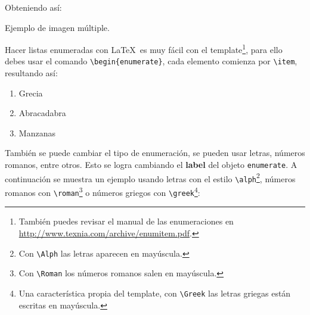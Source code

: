 	Obteniendo así:

	\begin{images}{Ejemplo de imagen múltiple.}
		\imagesnewline
	\end{images}


\newpage



		Hacer listas enumeradas con \LaTeX\ es muy fácil con el template\footnote{También puedes revisar el manual de las enumeraciones en \url{http://www.texnia.com/archive/enumitem.pdf}.}, para ello debes usar el comando \texttt{\textbackslash begin\{enumerate\}}, cada elemento comienza por \texttt{\textbackslash item}, resultando así:

		\begin{enumerate}
			\item Grecia
			\item Abracadabra
			\item Manzanas
		\end{enumerate}

		También se puede cambiar el tipo de enumeración, se pueden usar letras, números romanos, entre otros. Esto se logra cambiando el \textbf{label} del objeto \texttt{enumerate}. A continuación se muestra un ejemplo usando letras con el estilo \texttt{\textbackslash alph}\footnote{Con \texttt{\textbackslash Alph} las letras aparecen en mayúscula.}, números romanos con \texttt{\textbackslash roman}\footnote{Con \texttt{\textbackslash Roman} los números romanos salen en mayúscula.} o números griegos con \texttt{\textbackslash greek}\footnote{Una característica propia del template, con \texttt{\textbackslash Greek} las letras griegas están escritas en mayúscula.}:

